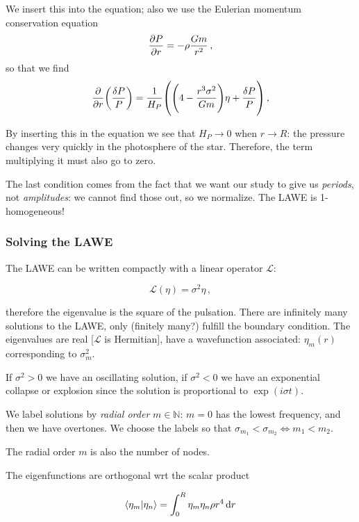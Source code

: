 \documentclass[main.tex]{subfiles}
\begin{document}
We insert this into the equation; also we use the Eulerian momentum conservation equation 
%
\begin{align}
\pdv{P}{r} = -\rho \frac{Gm}{r^2}
\,,
\end{align}
%
so that we find 
%
\begin{align}
\pdv{}{r} \qty(\frac{ \delta P}{P}) =
\frac{1}{H_P} \qty(
\qty(
4 - \frac{r^3 \sigma^2}{ Gm}
) \eta 
+ \frac{ \delta P }{P }
)
\,,
\end{align}
%

By inserting this in the equation we see that \(H_P \rightarrow 0\) when \(r \rightarrow R\): the pressure changes very quickly in the photosphere of the star. Therefore, the term multiplying it must also go to zero.

The last condition comes from the fact that we want our study to give us \emph{periods}, not \emph{amplitudes}: we cannot find those out, so we normalize. The LAWE is 1-homogeneous!

\subsubsection{Solving the LAWE}

The LAWE can be written compactly with a linear operator \(\mathcal L\):

\begin{equation}
  \mathcal L (\eta) = \sigma^2 \eta\,,
\end{equation}

therefore the eigenvalue is the square of the pulsation.
There are infinitely many solutions to the LAWE, only (finitely many?) fulfill the boundary condition.
The eigenvalues are real [\(\mathcal L\) is Hermitian], have a wavefunction associated: \(\eta_m (r)\) corresponding to \(\sigma_m ^2\).

If \(\sigma^2 > 0\) we have an oscillating solution, if \(\sigma^2 <0 \) we have an exponential collapse or explosion since the solution is proportional to \(\exp(i \sigma t)\).

We label solutions by \emph{radial order} \(m \in \mathbb{N}\): \(m=0\) has the lowest frequency, and then we have overtones.
We choose the labels so that \(\sigma_{m_1} < \sigma_{m_2} \iff m_1 < m_2\).

The radial order \(m\) is also the number of nodes.

The eigenfunctions are orthogonal wrt the scalar product

\begin{equation}
  \braket{\eta_m}{\eta_n} = \int _{0}   ^{R} \eta_m \eta_n \rho r^4 \dd{r}
\end{equation}
\end{document}
